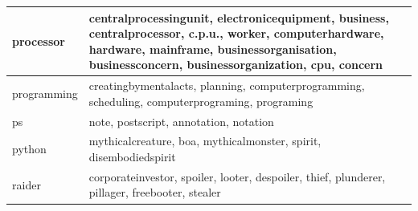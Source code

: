 \documentclass[12pt,a4paper]{report}
\begin{document}
\begin{table}[H]
\begin{center}
\begin{tabular}{ |l|p{13cm}|}
\hline
processor & centralprocessingunit, electronicequipment, business, centralprocessor, c.p.u., worker, computerhardware, hardware, mainframe, businessorganisation, businessconcern, businessorganization, cpu, concern\\
\hline
programming & creatingbymentalacts, planning, computerprogramming, scheduling, computerprograming, programing\\
\hline
ps & note, postscript, annotation, notation\\
\hline
python & mythicalcreature, boa, mythicalmonster, spirit, disembodiedspirit\\
\hline

raider & corporateinvestor, spoiler, looter, despoiler, thief, plunderer, pillager, freebooter, stealer\\
\hline

\end{tabular}
\end{center}
\end{table}
\end{document}
